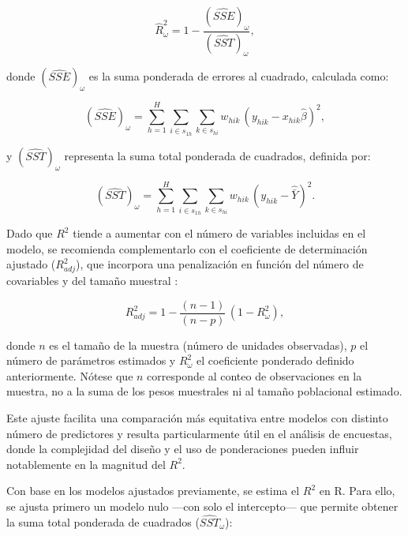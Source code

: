\documentclass[
  spanish,
  12pt,
]{book}
\newenvironment{Shaded}{\begin{snugshade}}{\end{snugshade}}
\newcommand{\AttributeTok}[1]{\textcolor[rgb]{0.13,0.29,0.53}{#1}}
\newcommand{\DecValTok}[1]{\textcolor[rgb]{0.00,0.00,0.81}{#1}}
\newcommand{\FunctionTok}[1]{\textcolor[rgb]{0.13,0.29,0.53}{\textbf{#1}}}
\newcommand{\NormalTok}[1]{#1}
\newcommand{\OtherTok}[1]{\textcolor[rgb]{0.56,0.35,0.01}{#1}}
\newcommand{\SpecialCharTok}[1]{\textcolor[rgb]{0.81,0.36,0.00}{\textbf{#1}}}
\begin{document}
\[
\hat{R}_\omega^2 = 1 - \frac{(\widehat{SSE})_\omega}{(\widehat{SST})_\omega},
\]

donde \((\widehat{SSE})_\omega\) es la suma ponderada de errores al cuadrado, calculada como:

\[
(\widehat{SSE})_\omega = \sum_{h=1}^{H} \sum_{i \in s_{1h}} \sum_{k \in s_{hi}} w_{hik} \,(y_{hik} - x_{hik}\hat{\beta})^2,
\]

y \((\widehat{SST})_\omega\) representa la suma total ponderada de cuadrados, definida por:

\[
(\widehat{SST})_\omega = \sum_{h=1}^{H} \sum_{i \in s_{1h}} \sum_{k \in s_{hi}} w_{hik}\,(y_{hik} - \hat{\bar{Y}})^2.
\]

Dado que \(R^{2}\) tiende a aumentar con el número de variables incluidas en el modelo, se recomienda complementarlo con el coeficiente de determinación ajustado (\(R_{adj}^{2}\)), que incorpora una penalización en función del número de covariables y del tamaño muestral \citep{pfeffermann2011modelling}:

\[
R_{adj}^{2} = 1 - \frac{(n-1)}{(n-p)} \,(1 - R_{\omega}^{2}),
\]

donde \(n\) es el tamaño de la muestra (número de unidades observadas), \(p\) el número de parámetros estimados y \(R_{\omega}^{2}\) el coeficiente ponderado definido anteriormente. Nótese que \(n\) corresponde al conteo de observaciones en la muestra, no a la suma de los pesos muestrales ni al tamaño poblacional estimado.

Este ajuste facilita una comparación más equitativa entre modelos con distinto número de predictores y resulta particularmente útil en el análisis de encuestas, donde la complejidad del diseño y el uso de ponderaciones pueden influir notablemente en la magnitud del \(R^{2}\).

Con base en los modelos ajustados previamente, se estima el \(R^{2}\) en R. Para ello, se ajusta primero un modelo nulo ---con solo el intercepto--- que permite obtener la suma total ponderada de cuadrados (\(\widehat{SST}_\omega\)):

\begin{Shaded}
\end{Shaded}
\end{document}
